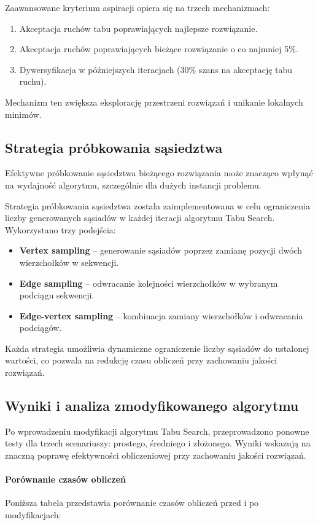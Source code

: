 \documentclass[12pt,a4paper]{article}
\begin{document}
Zaawansowane kryterium aspiracji opiera się na trzech mechanizmach:
\begin{enumerate}
    \item Akceptacja ruchów tabu poprawiających najlepsze rozwiązanie.
    \item Akceptacja ruchów poprawiających bieżące rozwiązanie o co najmniej 5\%.
    \item Dywersyfikacja w późniejszych iteracjach (30\% szans na akceptację tabu ruchu).
\end{enumerate}
Mechanizm ten zwiększa eksplorację przestrzeni rozwiązań i unikanie lokalnych minimów.

\subsection{Strategia próbkowania sąsiedztwa}
Efektywne próbkowanie sąsiedztwa bieżącego rozwiązania może znacząco wpłynąć na wydajność algorytmu, szczególnie dla dużych instancji problemu.

Strategia próbkowania sąsiedztwa została zaimplementowana w celu ograniczenia liczby generowanych sąsiadów w każdej iteracji algorytmu Tabu Search. Wykorzystano trzy podejścia:
\begin{itemize}
    \item \textbf{Vertex sampling} -- generowanie sąsiadów poprzez zamianę pozycji dwóch wierzchołków w sekwencji.
    \item \textbf{Edge sampling} -- odwracanie kolejności wierzchołków w wybranym podciągu sekwencji.
    \item \textbf{Edge-vertex sampling} -- kombinacja zamiany wierzchołków i odwracania podciągów.
\end{itemize}
Każda strategia umożliwia dynamiczne ograniczenie liczby sąsiadów do ustalonej wartości, co pozwala na redukcję czasu obliczeń przy zachowaniu jakości rozwiązań.

\subsection{Wyniki i analiza zmodyfikowanego algorytmu}
Po wprowadzeniu modyfikacji algorytmu Tabu Search, przeprowadzono ponowne testy dla trzech scenariuszy: prostego, średniego i złożonego. Wyniki wskazują na znaczną poprawę efektywności obliczeniowej przy zachowaniu jakości rozwiązań.

\paragraph{Porównanie czasów obliczeń}
Poniższa tabela przedstawia porównanie czasów obliczeń przed i po modyfikacjach:
\end{document}
